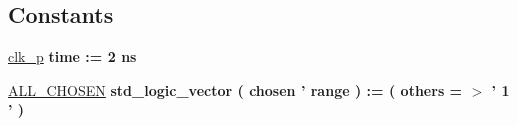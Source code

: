 \subsection*{Constants}
 \begin{DoxyCompactItemize}
\item 
\hypertarget{classlfsr__tb_1_1sim_ac1dd4fc6ce65755e29c83ff9b8609367}{\hyperlink{classlfsr__tb_1_1sim_ac1dd4fc6ce65755e29c83ff9b8609367}{clk\-\_\-p} {\bfseries \textcolor{comment}{time}\textcolor{vhdlchar}{ }\textcolor{vhdlchar}{ }\textcolor{vhdlchar}{\-:}\textcolor{vhdlchar}{=}\textcolor{vhdlchar}{ } \textcolor{vhdldigit}{2} \textcolor{vhdlchar}{ }\textcolor{vhdlchar}{ns}\textcolor{vhdlchar}{ }} }\label{classlfsr__tb_1_1sim_ac1dd4fc6ce65755e29c83ff9b8609367}

\item 
\hypertarget{classlfsr__tb_1_1sim_a7bde034fc12da33af41742f87897771b}{\hyperlink{classlfsr__tb_1_1sim_a7bde034fc12da33af41742f87897771b}{A\-L\-L\-\_\-\-C\-H\-O\-S\-E\-N} {\bfseries \textcolor{comment}{std\-\_\-logic\-\_\-vector}\textcolor{vhdlchar}{ }\textcolor{vhdlchar}{(}\textcolor{vhdlchar}{ }\textcolor{vhdlchar}{ }\textcolor{vhdlchar}{chosen}\textcolor{vhdlchar}{ }\textcolor{vhdlchar}{'}\textcolor{vhdlchar}{ }\textcolor{vhdlchar}{ }\textcolor{vhdlkeyword}{range}\textcolor{vhdlchar}{ }\textcolor{vhdlchar}{ }\textcolor{vhdlchar}{)}\textcolor{vhdlchar}{ }\textcolor{vhdlchar}{ }\textcolor{vhdlchar}{\-:}\textcolor{vhdlchar}{=}\textcolor{vhdlchar}{ }\textcolor{vhdlchar}{(}\textcolor{vhdlchar}{ }\textcolor{vhdlchar}{ }\textcolor{vhdlkeyword}{others}\textcolor{vhdlchar}{ }\textcolor{vhdlchar}{ }\textcolor{vhdlchar}{=}\textcolor{vhdlchar}{ }\textcolor{vhdlchar}{$>$}\textcolor{vhdlchar}{ }\textcolor{vhdlchar}{'}\textcolor{vhdlchar}{ } \textcolor{vhdldigit}{1} \textcolor{vhdlchar}{ }\textcolor{vhdlchar}{'}\textcolor{vhdlchar}{ }\textcolor{vhdlchar}{ }\textcolor{vhdlchar}{)}\textcolor{vhdlchar}{ }} }\label{classlfsr__tb_1_1sim_a7bde034fc12da33af41742f87897771b}

\end{DoxyCompactItemize}
